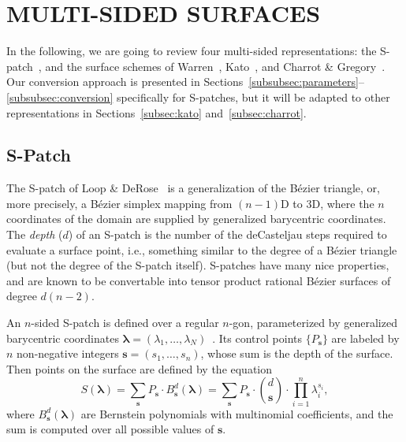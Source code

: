 \documentclass[9pt,academicons]{article}
\begin{document}
\section{MULTI-SIDED SURFACES}
\label{sec:multisided}
In the following, we are going to review four multi-sided representations:
the S-patch~\cite{Loop:1989}, and the surface schemes of Warren~\cite{Warren:1992},
Kato~\cite{Kato:1991}, and Charrot \& Gregory~\cite{Charrot:1984}.
Our conversion approach is presented in
Sections~\ref{subsubsec:parameters}--\ref{subsubsec:conversion}
specifically for S-patches, but it will be adapted to other representations in
Sections~\ref{subsec:kato} and~\ref{subsec:charrot}.

\subsection{S-Patch}
\label{subsec:spatch}
The S-patch of Loop \& DeRose~\cite{Loop:1989} is a generalization of the B\'ezier triangle, or,
more precisely, a B\'ezier simplex mapping from $(n-1)$D to 3D, where the $n$ coordinates of the
domain are supplied by generalized barycentric coordinates. The \emph{depth} ($d$) of an S-patch
is the number of the deCasteljau steps required to evaluate a surface point, i.e., something similar
to the degree of a B\'ezier triangle (but not the degree of the S-patch itself).
S-patches have many nice properties, and are known to be convertable into tensor product
rational B\'ezier surfaces of degree $d(n-2)$.

An $n$-sided S-patch is defined over a regular $n$-gon, parameterized by generalized
barycentric coordinates $\mathbf{\lambda}=(\lambda_1,\dots,\lambda_N)$~\cite{Floater:2015}.
Its control
points $\{P_\mathbf{s}\}$ are labeled by $n$ non-negative integers $\mathbf{s}=(s_1,\dots,s_n)$,
whose sum is the depth of the surface. Then points on the surface are defined by
the equation
\begin{equation}
  \label{eq:spatch}
  S(\mathbf{\lambda})=\sum_{\mathbf{s}}P_\mathbf{s}\cdot B_\mathbf{s}^d(\mathbf{\lambda})
  =\sum_{\mathbf{s}}P_\mathbf{s}\cdot {d\choose\mathbf{s}}\cdot\prod_{i=1}^n\lambda_i^{s_i},
\end{equation}
where $B_\mathbf{s}^d(\mathbf{\lambda})$ are Bernstein polynomials with multinomial coefficients,
and the sum is computed over all possible values of $\mathbf{s}$.
\end{document}

